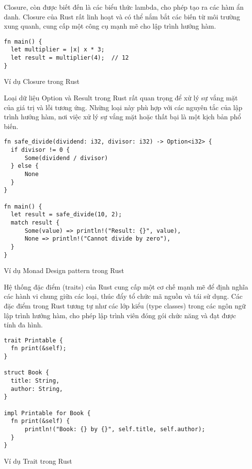 Closure, còn được biết đến là các biểu thức lambda, cho phép tạo ra các hàm ẩn danh. Closure của Rust rất linh hoạt và có thể nắm bắt các biến từ môi trường xung quanh, cung cấp một công cụ mạnh mẽ cho lập trình hướng hàm.

\begin{listing}[H]
\begin{verbatim}
fn main() {
  let multiplier = |x| x * 3;
  let result = multiplier(4);  // 12
}
\end{verbatim}
\caption{Ví dụ Closure trong Rust}
\label{fp:closure}
\end{listing}

Loại dữ liệu Option và Result trong Rust rất quan trọng để xử lý sự vắng mặt của giá trị và lỗi tương ứng. Những loại này phù hợp với các nguyên tắc của lập trình hướng hàm, nơi việc xử lý sự vắng mặt hoặc thất bại là một kịch bản phổ biến.

\begin{listing}[H]
\begin{verbatim}
fn safe_divide(dividend: i32, divisor: i32) -> Option<i32> {
  if divisor != 0 {
      Some(dividend / divisor)
  } else {
      None
  }
}

fn main() {
  let result = safe_divide(10, 2);
  match result {
      Some(value) => println!("Result: {}", value),
      None => println!("Cannot divide by zero"),
  }
}
\end{verbatim}
\caption{Ví dụ Monad Design pattern trong Rust}
\label{fp:monad}
\end{listing}

Hệ thống đặc điểm (traits) của Rust cung cấp một cơ chế mạnh mẽ để định nghĩa các hành vi chung giữa các loại, thúc đẩy tổ chức mã nguồn và tái sử dụng. Các đặc điểm trong Rust tương tự như các lớp kiểu (type classes) trong các ngôn ngữ lập trình hướng hàm, cho phép lập trình viên đóng gói chức năng và đạt được tính đa hình.

\begin{listing}[H]
\begin{verbatim}
trait Printable {
  fn print(&self);
}

struct Book {
  title: String,
  author: String,
}

impl Printable for Book {
  fn print(&self) {
      println!("Book: {} by {}", self.title, self.author);
  }
}
\end{verbatim}
\caption{Ví dụ Trait trong Rust}
\label{fp:trait}
\end{listing}

